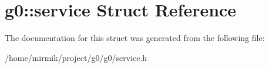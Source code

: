 \hypertarget{structg0_1_1service}{}\section{g0\+:\+:service Struct Reference}
\label{structg0_1_1service}


The documentation for this struct was generated from the following file\+:\begin{DoxyCompactItemize}
\item 
/home/mirmik/project/g0/g0/service.\+h\end{DoxyCompactItemize}
